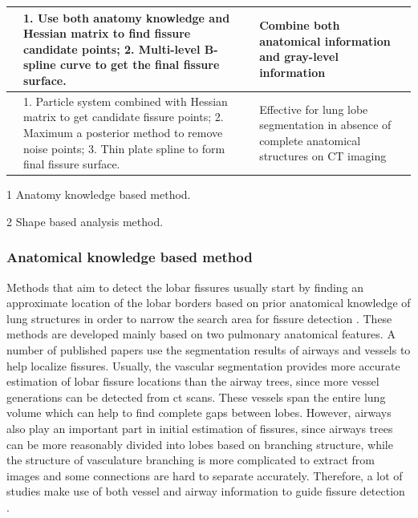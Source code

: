 \begin{table}[htbp]
\begin{threeparttable}
\begin{tabular}{|p{4.3cm}|p{6.3cm}|p{4.8cm}|}
\hline
\cite{doel2012pulmonary} & 1. Use both anatomy knowledge and Hessian matrix to find fissure candidate points; 2. Multi-level B-spline curve to get the final fissure surface. & Combine both anatomical information and gray-level information\tnote{1,2}\\
\hline
\cite{ross2010automatic,ross2013pulmonary} & 1. Particle system combined with Hessian matrix to get candidate fissure points; 2. Maximum a posterior method to remove noise points; 3. Thin plate spline to form final fissure surface. & Effective for lung lobe segmentation in absence of complete anatomical structures on CT imaging\tnote{2}\\
\hline
\end{tabular}
\begin{tablenotes}
        \footnotesize
        \item[1] Anatomy knowledge based method.
        \item[2] Shape based analysis method.
\end{tablenotes}
\end{threeparttable}
\end{table}

\subsubsection{Anatomical knowledge based method}
Methods that aim to detect the lobar fissures usually start by finding an approximate location of the lobar borders based on prior anatomical knowledge of lung structures in order to narrow the search area for fissure detection \citep{kuhnigk2003lung,kuhnigk2005informatics,zhou2004automatic,saita2006algorithm,zhang2006atlas,ukil2009anatomy,pu2009computational,lassen2010automatic,doel2012pulmonary}. These methods are developed mainly based on two pulmonary anatomical features. A number of published papers use the segmentation results of airways and vessels to help localize fissures. Usually, the vascular segmentation provides more accurate estimation of lobar fissure locations than the airway trees, since more vessel generations can be detected from \gls{ct} scans. These vessels span the entire lung volume which can help to find complete gaps between lobes. However, airways also play an important part in initial estimation of fissures, since airways trees can be more reasonably divided into lobes based on branching structure, while the structure of vasculature branching is more complicated to extract from images and some connections are hard to separate accurately. Therefore, a lot of studies make use of both vessel and airway information to guide fissure detection \citep{ukil2009anatomy,lassen2010automatic,doel2012pulmonary}.

